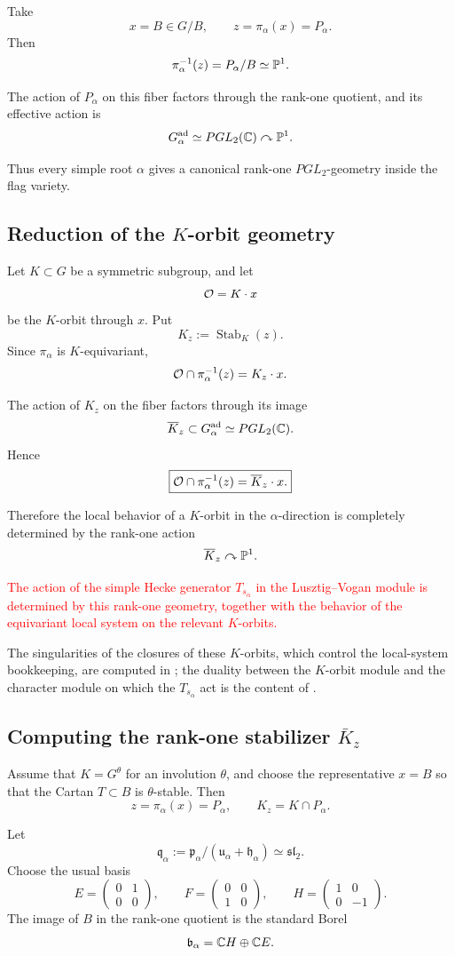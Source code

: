Take
\[
x=B\in G/B,\qquad
z=\pi_\alpha(x)=P_\alpha.
\]
Then
\[
\pi_\alpha^{-1}(z)
=
P_\alpha/B
\simeq \mathbb{P}^1.
\]

The action of $P_\alpha$ on this fiber factors through the rank-one
quotient, and its effective action is
\[
G_\alpha^{\mathrm{ad}}
\simeq PGL_2(\mathbb{C})
\curvearrowright
\mathbb{P}^1.
\]

Thus every simple root $\alpha$ gives a canonical rank-one
$PGL_2$-geometry inside the flag variety.

\subsection*{Reduction of the $K$-orbit geometry}

Let $K\subset G$ be a symmetric subgroup, and let
\[
\mathcal{O}=K\cdot x
\]
be the $K$-orbit through $x$. Put
\[
K_z:=\operatorname{Stab}_K(z).
\]
Since $\pi_\alpha$ is $K$-equivariant,
\[
\mathcal{O}\cap \pi_\alpha^{-1}(z)
=
K_z\cdot x.
\]

The action of $K_z$ on the fiber factors through its image
\[
\overline K_z
\subset
G_\alpha^{\mathrm{ad}}
\simeq PGL_2(\mathbb{C}).
\]
Hence
\[
\boxed{
\mathcal{O}\cap\pi_\alpha^{-1}(z)
=
\overline K_z\cdot x.
}
\]

Therefore the local behavior of a $K$-orbit in the $\alpha$-direction
is completely determined by the rank-one action
\[
\overline K_z\curvearrowright\mathbb{P}^1.
\]

\textcolor{red}{
The action of the simple Hecke generator $T_{s_\alpha}$ in the
Lusztig--Vogan module is determined by this rank-one geometry,
together with the behavior of the equivariant local system on the
relevant $K$-orbits.
}

The singularities of the closures of these $K$-orbits, which control the
local-system bookkeeping, are computed in \cite{LusztigVogan1983}; the
duality between the $K$-orbit module and the character module on which the
$T_{s_\alpha}$ act is the content of \cite{Vogan1982}.

\subsection*{Computing the rank-one stabilizer $\bar K_z$}

Assume that $K=G^\theta$ for an involution $\theta$, and choose the
representative $x=B$ so that the Cartan $T\subset B$ is $\theta$-stable.
Then
\[
z=\pi_\alpha(x)=P_\alpha,
\qquad
K_z=K\cap P_\alpha.
\]

Let
\[
\mathfrak q_\alpha
:=
\mathfrak p_\alpha/
(\mathfrak u_\alpha+\mathfrak h_\alpha)
\simeq \mathfrak{sl}_2.
\]
Choose the usual basis
\[
E=
\begin{pmatrix}
0&1\\
0&0
\end{pmatrix},
\qquad
F=
\begin{pmatrix}
0&0\\
1&0
\end{pmatrix},
\qquad
H=
\begin{pmatrix}
1&0\\
0&-1
\end{pmatrix}.
\]
The image of $B$ in the rank-one quotient is the standard Borel
\[
\mathfrak b_\alpha
=
\mathbb{C} H\oplus \mathbb{C} E.
\]

